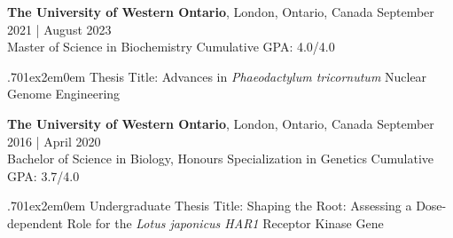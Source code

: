 \documentclass[a4paper,9pt]{extarticle}
\begin{document}
\noindent
\begin{minipage}{1\textwidth}
\textbf{The University of Western Ontario}, London, Ontario, Canada \hfill September 2021 | August 2023\\ 
Master of Science in Biochemistry \hfill Cumulative GPA: 4.0/4.0 \par %
{\hsize.70\linewidth\parskip1ex\hangindent2em\parindent0em 
	\setlength{\parskip}{0pt} %
Thesis Title: Advances in \textit{Phaeodactylum tricornutum} Nuclear Genome Engineering\par}
\end{minipage}
\vspace{\parskip}


\noindent
\begin{minipage}{1\textwidth}
\textbf{The University of Western Ontario}, London, Ontario, Canada \hfill September 2016 | April 2020\\ 
Bachelor of Science in Biology, Honours Specialization in Genetics \hfill Cumulative GPA: 3.7/4.0 \par %
{\hsize.70\linewidth\parskip1ex\hangindent2em\parindent0em 
	\setlength{\parskip}{0pt} %
Undergraduate Thesis Title: Shaping the Root: Assessing a Dose-dependent Role for the \textit{Lotus japonicus HAR1} Receptor Kinase Gene \par}
\end{minipage}

\end{document}
